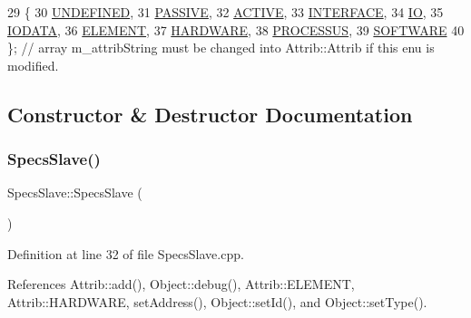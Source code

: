 \begin{DoxyCode}
29                 \{
30     \hyperlink{classAttrib_a69e171d7cc6417835a5a306d3c764235a3a8da2ab97dda18aebab196fe4100531}{UNDEFINED},
31     \hyperlink{classAttrib_a69e171d7cc6417835a5a306d3c764235a2bfb2af57b87031d190a05fe25dd92ed}{PASSIVE},
32     \hyperlink{classAttrib_a69e171d7cc6417835a5a306d3c764235a3b1fec929c0370d1436f2f06e298fb0d}{ACTIVE},
33     \hyperlink{classAttrib_a69e171d7cc6417835a5a306d3c764235aa27c16b480a369ea4d18b07b2516bbc7}{INTERFACE},
34     \hyperlink{classAttrib_a69e171d7cc6417835a5a306d3c764235a1420a5b8c0540b2af210b6975eded7f9}{IO},
35     \hyperlink{classAttrib_a69e171d7cc6417835a5a306d3c764235a0af3b0d0ac323c1704e6c69cf90add28}{IODATA},
36     \hyperlink{classAttrib_a69e171d7cc6417835a5a306d3c764235a7788bc5dd333fd8ce18562b269c9dab1}{ELEMENT},
37     \hyperlink{classAttrib_a69e171d7cc6417835a5a306d3c764235a61ceb22149f365f1780d18f9d1459423}{HARDWARE},
38     \hyperlink{classAttrib_a69e171d7cc6417835a5a306d3c764235a75250e29692496e73effca2c0330977f}{PROCESSUS},
39     \hyperlink{classAttrib_a69e171d7cc6417835a5a306d3c764235a103a67cd0b8f07ef478fa45d4356e27b}{SOFTWARE} 
40   \}; \textcolor{comment}{// array m\_attribString must be changed into Attrib::Attrib if this enu is modified. }
\end{DoxyCode}


\subsection{Constructor \& Destructor Documentation}
\mbox{\label{classSpecsSlave_a4170ce73e2fd5ce2b8a7b8ef55226556}} 
\subsubsection{\texorpdfstring{Specs\+Slave()}{SpecsSlave()}}
{\footnotesize\ttfamily Specs\+Slave\+::\+Specs\+Slave (\begin{DoxyParamCaption}{ }\end{DoxyParamCaption})}



Definition at line 32 of file Specs\+Slave.\+cpp.



References Attrib\+::add(), Object\+::debug(), Attrib\+::\+E\+L\+E\+M\+E\+NT, Attrib\+::\+H\+A\+R\+D\+W\+A\+RE, set\+Address(), Object\+::set\+Id(), and Object\+::set\+Type().


